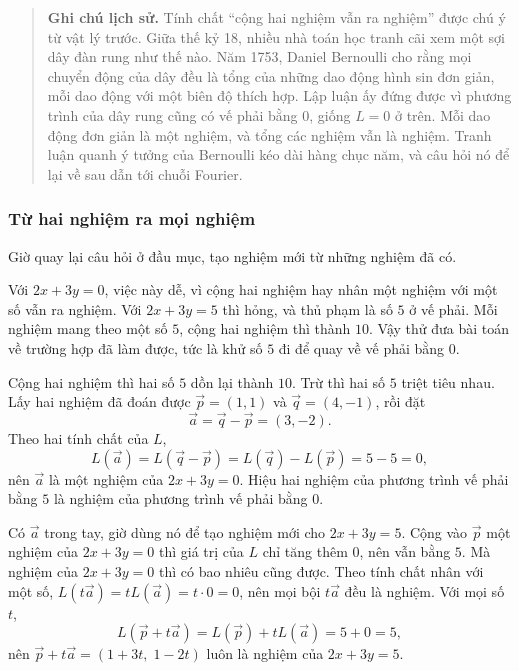 \documentclass[12pt,a4paper]{article}
\begin{document}
\begin{quote}
\textbf{Ghi chú lịch sử.} Tính chất ``cộng hai nghiệm vẫn ra nghiệm'' được chú ý từ vật lý trước. Giữa thế kỷ 18, nhiều nhà toán học tranh cãi xem một sợi dây đàn rung như thế nào. Năm 1753, Daniel Bernoulli cho rằng mọi chuyển động của dây đều là tổng của những dao động hình sin đơn giản, mỗi dao động với một biên độ thích hợp. Lập luận ấy đứng được vì phương trình của dây rung cũng có vế phải bằng \(0\), giống \(L=0\) ở trên. Mỗi dao động đơn giản là một nghiệm, và tổng các nghiệm vẫn là nghiệm. Tranh luận quanh ý tưởng của Bernoulli kéo dài hàng chục năm, và câu hỏi nó để lại về sau dẫn tới chuỗi Fourier.
\end{quote}

\subsubsection{Từ hai nghiệm ra mọi nghiệm}

Giờ quay lại câu hỏi ở đầu mục, tạo nghiệm mới từ những nghiệm đã có.

Với \(2x+3y=0\), việc này dễ, vì cộng hai nghiệm hay nhân một nghiệm với một số vẫn ra nghiệm. Với \(2x+3y=5\) thì hỏng, và thủ phạm là số \(5\) ở vế phải. Mỗi nghiệm mang theo một số \(5\), cộng hai nghiệm thì thành \(10\). Vậy thử đưa bài toán về trường hợp đã làm được, tức là khử số \(5\) đi để quay về vế phải bằng \(0\).

Cộng hai nghiệm thì hai số \(5\) dồn lại thành \(10\). Trừ thì hai số \(5\) triệt tiêu nhau. Lấy hai nghiệm đã đoán được \(\vec{p}=(1,1)\) và \(\vec{q}=(4,-1)\), rồi đặt
$$ \vec{a}=\vec{q}-\vec{p}=(3,-2). $$
Theo hai tính chất của \(L\),
$$ L(\vec{a})=L(\vec{q}-\vec{p})=L(\vec{q})-L(\vec{p})=5-5=0, $$
nên \(\vec{a}\) là một nghiệm của \(2x+3y=0\). Hiệu hai nghiệm của phương trình vế phải bằng \(5\) là nghiệm của phương trình vế phải bằng \(0\).

Có \(\vec{a}\) trong tay, giờ dùng nó để tạo nghiệm mới cho \(2x+3y=5\). Cộng vào \(\vec{p}\) một nghiệm của \(2x+3y=0\) thì giá trị của \(L\) chỉ tăng thêm \(0\), nên vẫn bằng \(5\). Mà nghiệm của \(2x+3y=0\) thì có bao nhiêu cũng được. Theo tính chất nhân với một số, \(L(t\vec{a})=tL(\vec{a})=t\cdot0=0\), nên mọi bội \(t\vec{a}\) đều là nghiệm. Với mọi số \(t\),
$$ L(\vec{p}+t\vec{a})=L(\vec{p})+tL(\vec{a})=5+0=5, $$
nên \(\vec{p}+t\vec{a}=(1+3t,\;1-2t)\) luôn là nghiệm của \(2x+3y=5\).
\end{document}

